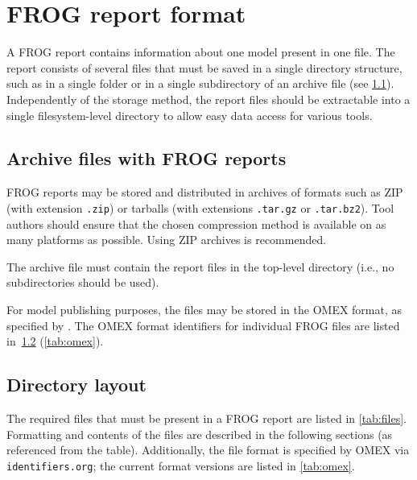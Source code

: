 \chapter{FROG report format}
\label{chap:spec}

A FROG report contains information about one model present in one file.
The report consists of several files that must be saved in a single directory structure, such as in a single folder or in a single subdirectory of an archive file (see \cref{sec:archives}).
Independently of the storage method, the report files should be extractable into a single filesystem-level directory to allow easy data access for various tools.

\section{Archive files with FROG reports}
\label{sec:archives}

FROG reports may be stored and distributed in archives of formats such as ZIP (with extension \texttt{.zip}) or tarballs (with extensions \texttt{.tar.gz} or \texttt{.tar.bz2}).
Tool authors should ensure that the chosen compression method is available on as many platforms as possible. Using ZIP archives is recommended.

The archive file must contain the report files in the top-level directory (i.e., no subdirectories should be used).

For model publishing purposes, the files may be stored in the OMEX format, as specified by \citeauthor{bergmann2014omex}. The OMEX format identifiers for individual FROG files are listed in~\cref{sec:files} (\cref{tab:omex}).

\section{Directory layout}
\label{sec:files}

The required files that must be present in a FROG report are listed in \cref{tab:files}. Formatting and contents of the files are described in the following sections (as referenced from the table). Additionally, the file format is specified by OMEX via \texttt{identifiers.org}; the current format versions are listed in \cref{tab:omex}.

